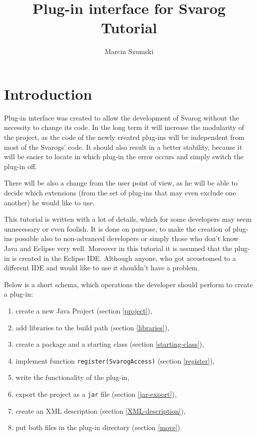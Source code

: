 \documentclass{article}
\begin{document}
\title{Plug-in interface for Svarog\\ Tutorial}
\author{Marcin Szumski}
\maketitle

\tableofcontents

\section{Introduction}

Plug-in interface was created to allow the development of Svarog without the necessity to change its code.
In the long term it will increase the modularity of the project, as the code of the newly created plug-ins will
be independent from most of the Svarogs' code.
It should also result in a better stability, because it will be easier to locate in which plug-in the error occurs and simply switch the plug-in off.

There will be also a change from the user point of view, as he will be able to decide which extensions (from the set of plug-ins that may even exclude one another) he would like to use.

This tutorial is written with a lot of details, which for some developers may seem unnecessary or even foolish.
It is done on purpose, to make the creation of plug-ins possible also to non-advanced developers or simply those who don't know Java and Eclipse very well.
Moreover in this tutorial it is assumed that the plug-in is created in the Eclipse IDE.
Although anyone, who got accustomed to a different IDE and would like to use it shouldn't have a problem.

Below is a short schema, which operations the developer should perform to create a plug-in:
\begin{enumerate}
	\item create a new Java Project (section \ref{project}),
	\item add libraries to the build path (section \ref{libraries}),
	\item create a package and a starting class (section \ref{starting-class}),
	\item implement function \verb=register(SvarogAccess)= (section \ref{register}),
	\item write the functionality of the plug-in,
	\item export the project as a \verb=jar= file (section \ref{jar-export}),
	\item create an XML description (section \ref{XML-description}),
	\item put both files in the plug-in directory (section \ref{move}).
\end{enumerate}
\end{document}

